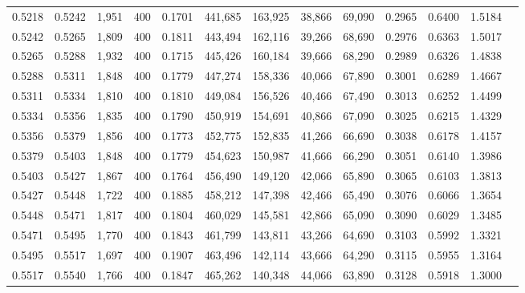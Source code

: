 \begin{tabular}{rrrrrrrrrrrrr}
0.5218 & 0.5242 &  1,951 & 400 &                                     0.1701 & 441,685 & 163,925 &  38,866 &  69,090 & 0.2965 & 0.6400 & 1.5184 \\
0.5242 & 0.5265 &  1,809 & 400 &                                     0.1811 & 443,494 & 162,116 &  39,266 &  68,690 & 0.2976 & 0.6363 & 1.5017 \\
0.5265 & 0.5288 &  1,932 & 400 &                                     0.1715 & 445,426 & 160,184 &  39,666 &  68,290 & 0.2989 & 0.6326 & 1.4838 \\
0.5288 & 0.5311 &  1,848 & 400 &                                     0.1779 & 447,274 & 158,336 &  40,066 &  67,890 & 0.3001 & 0.6289 & 1.4667 \\
0.5311 & 0.5334 &  1,810 & 400 &                                     0.1810 & 449,084 & 156,526 &  40,466 &  67,490 & 0.3013 & 0.6252 & 1.4499 \\
0.5334 & 0.5356 &  1,835 & 400 &                                     0.1790 & 450,919 & 154,691 &  40,866 &  67,090 & 0.3025 & 0.6215 & 1.4329 \\
0.5356 & 0.5379 &  1,856 & 400 &                                     0.1773 & 452,775 & 152,835 &  41,266 &  66,690 & 0.3038 & 0.6178 & 1.4157 \\
0.5379 & 0.5403 &  1,848 & 400 &                                     0.1779 & 454,623 & 150,987 &  41,666 &  66,290 & 0.3051 & 0.6140 & 1.3986 \\
0.5403 & 0.5427 &  1,867 & 400 &                                     0.1764 & 456,490 & 149,120 &  42,066 &  65,890 & 0.3065 & 0.6103 & 1.3813 \\
0.5427 & 0.5448 &  1,722 & 400 &                                     0.1885 & 458,212 & 147,398 &  42,466 &  65,490 & 0.3076 & 0.6066 & 1.3654 \\
0.5448 & 0.5471 &  1,817 & 400 &                                     0.1804 & 460,029 & 145,581 &  42,866 &  65,090 & 0.3090 & 0.6029 & 1.3485 \\
0.5471 & 0.5495 &  1,770 & 400 &                                     0.1843 & 461,799 & 143,811 &  43,266 &  64,690 & 0.3103 & 0.5992 & 1.3321 \\
0.5495 & 0.5517 &  1,697 & 400 &                                     0.1907 & 463,496 & 142,114 &  43,666 &  64,290 & 0.3115 & 0.5955 & 1.3164 \\
0.5517 & 0.5540 &  1,766 & 400 &                                     0.1847 & 465,262 & 140,348 &  44,066 &  63,890 & 0.3128 & 0.5918 & 1.3000 \\

\end{tabular}
